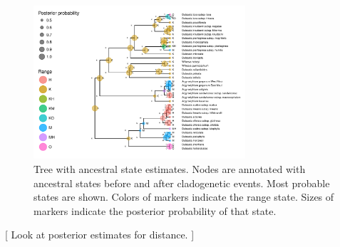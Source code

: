 \begin{figure}[!ht]
\centering
\includegraphics[width=0.7\textwidth]{figures/fig_epoch_RevGadgets_ase.pdf}
\caption{Tree with ancestral state estimates. Nodes are annotated with ancestral states before and after cladogenetic events. Most probable states are shown. Colors of markers indicate the range state. Sizes of markers indicate the posterior probability of that state. }
\end{figure}

[ Look at posterior estimates for distance. ]

\newpage
